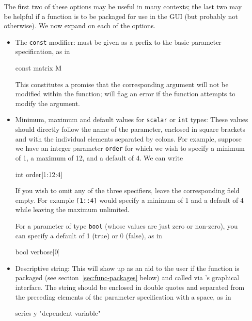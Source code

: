 The first two of these options may be useful in many contexts; the
last two may be helpful if a function is to be packaged for use in
the  GUI (but probably not otherwise). We now expand on
each of the options.

\begin{itemize}

\item The \texttt{const} modifier: must be given as a prefix to the
  basic parameter specification, as in
%    
\begin{code}
const matrix M
\end{code} 
%
This constitutes a promise that the corresponding argument will not be
modified within the function;  will flag an error if
the function attempts to modify the argument.

\item Minimum, maximum and default values for \texttt{scalar} or
  \texttt{int} types: These values should directly follow the name of
  the parameter, enclosed in square brackets and with the individual
  elements separated by colons.  For example, suppose we have an
  integer parameter \texttt{order} for which we wish to specify a
  minimum of 1, a maximum of 12, and a default of 4.  We can write
%    
\begin{code}
int order[1:12:4]
\end{code} 
%
If you wish to omit any of the three specifiers, leave the
corresponding field empty.  For example \texttt{[1::4]} would specify
a minimum of 1 and a default of 4 while leaving the maximum
unlimited.  

For a parameter of type \texttt{bool} (whose values are just zero or
non-zero), you can specify a default of 1 (true) or 0 (false), as in
%    
\begin{code}
bool verbose[0]
\end{code} 

\item Descriptive string: This will show up as an aid to the user if
  the function is packaged (see section~\ref{sec:func-packages} below)
  and called via 's graphical interface.  The string should
  be enclosed in double quotes and separated from the preceding
  elements of the parameter specification with a space, as in
%
\begin{code}
series y "dependent variable"
\end{code} 


\end{itemize}

